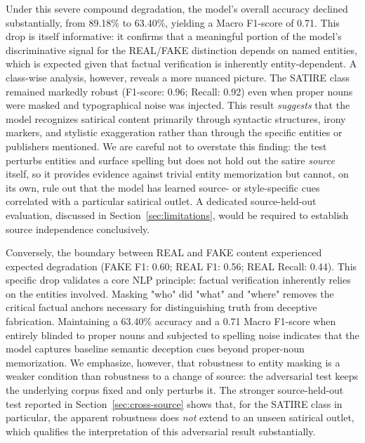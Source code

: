 \documentclass[informatics,article,submit,pdftex,moreauthors]{Definitions/mdpi}
\begin{document}
Under this severe compound degradation, the model's overall accuracy declined substantially, from 89.18\% to 63.40\%, yielding a Macro F1-score of 0.71. This drop is itself informative: it confirms that a meaningful portion of the model's discriminative signal for the REAL/FAKE distinction depends on named entities, which is expected given that factual verification is inherently entity-dependent. A class-wise analysis, however, reveals a more nuanced picture. The SATIRE class remained markedly robust (F1-score: 0.96; Recall: 0.92) even when proper nouns were masked and typographical noise was injected. This result \emph{suggests} that the model recognizes satirical content primarily through syntactic structures, irony markers, and stylistic exaggeration rather than through the specific entities or publishers mentioned. We are careful not to overstate this finding: the test perturbs entities and surface spelling but does not hold out the satire \emph{source} itself, so it provides evidence against trivial entity memorization but cannot, on its own, rule out that the model has learned source- or style-specific cues correlated with a particular satirical outlet. A dedicated source-held-out evaluation, discussed in Section~\ref{sec:limitations}, would be required to establish source independence conclusively.

Conversely, the boundary between REAL and FAKE content experienced expected degradation (FAKE F1: 0.60; REAL F1: 0.56; REAL Recall: 0.44). This specific drop validates a core NLP principle: factual verification inherently relies on the entities involved. Masking "who" did "what" and "where" removes the critical factual anchors necessary for distinguishing truth from deceptive fabrication. Maintaining a 63.40\% accuracy and a 0.71 Macro F1-score when entirely blinded to proper nouns and subjected to spelling noise indicates that the model captures baseline semantic deception cues beyond proper-noun memorization. We emphasize, however, that robustness to entity masking is a weaker condition than robustness to a change of source: the adversarial test keeps the underlying corpus fixed and only perturbs it. The stronger source-held-out test reported in Section~\ref{sec:cross-source} shows that, for the SATIRE class in particular, the apparent robustness does \emph{not} extend to an unseen satirical outlet, which qualifies the interpretation of this adversarial result substantially.
\end{document}

